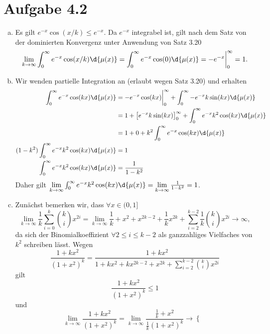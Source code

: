 \documentclass{article}
\begin{document}
    \section*{Aufgabe 4.2}
    \begin{enumerate}[(a)]
        \item Es gilt $e^{-x} \cos(x/k) \le e^{-x}$. Da $e^{-x}$ integrabel ist, gilt nach dem Satz von der dominierten Konvergenz unter Anwendung von Satz 3.20
        \[
            \lim\limits_{k \to \infty} \int_0^\infty e^{-x} \cos(x/k) \d{\mu(x)} = \int_0^\infty e^{-x} \cos(0) \d{\mu(x)} = -e^{-x}\bigg|_0^\infty = 1.
        \]
        \item Wir wenden partielle Integration an (erlaubt wegen Satz 3.20) und erhalten
        \begin{align*}
            \int_0^\infty e^{-x} \cos(kx) \d{\mu(x)} &= -e^{-x} \cos(kx) \bigg|_0^\infty + \int_0^\infty- e^{-x} k \sin(kx) \d{\mu(x)}\\
            &= 1 + \left[e^{-x}k\sin(kx)\right]_{0}^\infty + \int_0^\infty e^{-x} k^2 \cos(kx) \d{\mu(x)}\\
            &= 1 + 0 + k^2\int_0^\infty e^{-x} \cos(kx) \d{\mu(x)}\\
            (1 - k^2)\int_0^\infty e^{-x} k^2 \cos(kx) \d{\mu(x)} &= 1\\
            \int_0^\infty e^{-x} k^2 \cos(kx) \d{\mu(x)} &= \frac{1}{1-k^2}
        \end{align*}
        Daher gilt $\lim\limits_{k \to \infty} \int_0^\infty e^{-x} k^2 \cos(kx) \d{\mu(x)} = \lim\limits_{k \to \infty} \frac{1}{1-k^2} = 1$.
        \item Zunächst bemerken wir, dass $\forall x \in (0,1]$
        \[
            \lim\limits_{k \to \infty} \frac{1}{k} \sum_{i = 0}^{k} \binom{k}{i} x^{2i} = \lim\limits_{k \to \infty} \frac{1}{k} + x^2 + x^{2k -2} + \frac{1}{k}x^{2k} + \sum_{i = 2}^{k-2} \frac{1}{k}\binom{k}{i} x^{2i} \to \infty,
        \]
        da sich der Binomialkoeffizient $\forall 2 \leq i \leq k-2$ als ganzzahliges Vielfaches von $k^2$ schreiben lässt.
        Wegen
        \[
            \frac{1 + kx^2}{(1+x^2)^k} = \frac{1 + kx^2}{1 + kx^2 + kx^{2k -2} + x^{2k} + \sum_{i = 2}^{k-2} \binom{k}{i} x^{2i}}
        \]
        gilt 
        \[
            \frac{1 + kx^2}{(1+x^2)^k} \leq 1
        \]
        und
        \[
            \lim\limits_{k \to \infty} \frac{1 + kx^2}{(1+x^2)^k} = \lim\limits_{k \to \infty} \frac{\frac{1}{k} + x^2}{\frac{1}{k}(1+x^2)^k} \to \begin{cases}

\end{cases}\]
\end{enumerate}
\end{document}
